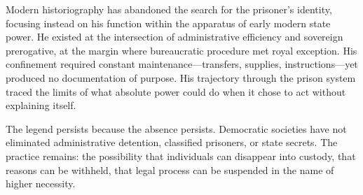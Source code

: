 Modern historiography has abandoned the search for the prisoner's identity, focusing instead on his function within the apparatus of early modern state power. He existed at the intersection of administrative efficiency and sovereign prerogative, at the margin where bureaucratic procedure met royal exception. His confinement required constant maintenance—transfers, supplies, instructions—yet produced no documentation of purpose. His trajectory through the prison system traced the limits of what absolute power could do when it chose to act without explaining itself.

The legend persists because the absence persists. Democratic societies have not eliminated administrative detention, classified prisoners, or state secrets. The practice remains: the possibility that individuals can disappear into custody, that reasons can be withheld, that legal process can be suspended in the name of higher necessity. 

